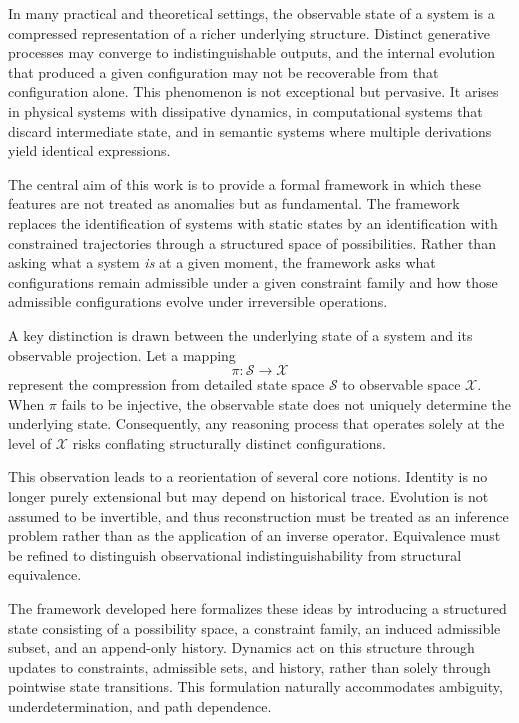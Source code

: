 \documentclass[11pt,oneside]{article}
\begin{document}
In many practical and theoretical settings, the observable state of a system is a compressed representation of a richer underlying structure. Distinct generative processes may converge to indistinguishable outputs, and the internal evolution that produced a given configuration may not be recoverable from that configuration alone. This phenomenon is not exceptional but pervasive. It arises in physical systems with dissipative dynamics, in computational systems that discard intermediate state, and in semantic systems where multiple derivations yield identical expressions.

The central aim of this work is to provide a formal framework in which these features are not treated as anomalies but as fundamental. The framework replaces the identification of systems with static states by an identification with constrained trajectories through a structured space of possibilities. Rather than asking what a system \emph{is} at a given moment, the framework asks what configurations remain admissible under a given constraint family and how those admissible configurations evolve under irreversible operations.

A key distinction is drawn between the underlying state of a system and its observable projection. Let a mapping
\[
\pi : \mathcal{S} \to \mathcal{X}
\]
represent the compression from detailed state space $\mathcal{S}$ to observable space $\mathcal{X}$. When $\pi$ fails to be injective, the observable state does not uniquely determine the underlying state. Consequently, any reasoning process that operates solely at the level of $\mathcal{X}$ risks conflating structurally distinct configurations.

This observation leads to a reorientation of several core notions. Identity is no longer purely extensional but may depend on historical trace. Evolution is not assumed to be invertible, and thus reconstruction must be treated as an inference problem rather than as the application of an inverse operator. Equivalence must be refined to distinguish observational indistinguishability from structural equivalence.

The framework developed here formalizes these ideas by introducing a structured state consisting of a possibility space, a constraint family, an induced admissible subset, and an append-only history. Dynamics act on this structure through updates to constraints, admissible sets, and history, rather than solely through pointwise state transitions. This formulation naturally accommodates ambiguity, underdetermination, and path dependence.
\end{document}

